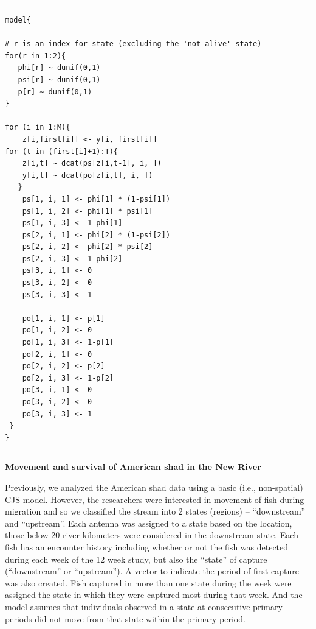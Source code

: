 \begin{panel}[htp]
\centering
\rule[0.1in]{\textwidth}{.03in}
{\small
\begin{verbatim}
model{

# r is an index for state (excluding the 'not alive' state)
for(r in 1:2){
   phi[r] ~ dunif(0,1)
   psi[r] ~ dunif(0,1)
   p[r] ~ dunif(0,1)
}    

for (i in 1:M){
    z[i,first[i]] <- y[i, first[i]]
for (t in (first[i]+1):T){
    z[i,t] ~ dcat(ps[z[i,t-1], i, ])
    y[i,t] ~ dcat(po[z[i,t], i, ])
   }
	ps[1, i, 1] <- phi[1] * (1-psi[1])
	ps[1, i, 2] <- phi[1] * psi[1]
	ps[1, i, 3] <- 1-phi[1]
	ps[2, i, 1] <- phi[2] * (1-psi[2])
	ps[2, i, 2] <- phi[2] * psi[2]
	ps[2, i, 3] <- 1-phi[2]
	ps[3, i, 1] <- 0
	ps[3, i, 2] <- 0
	ps[3, i, 3] <- 1

	po[1, i, 1] <- p[1]
	po[1, i, 2] <- 0
	po[1, i, 3] <- 1-p[1]
	po[2, i, 1] <- 0
	po[2, i, 2] <- p[2]
	po[2, i, 3] <- 1-p[2]
	po[3, i, 1] <- 0
	po[3, i, 2] <- 0
	po[3, i, 3] <- 1
 }
}
\end{verbatim}
}
\rule[-0.1in]{\textwidth}{.03in}
\caption{
\jags~ model specification for a two-state version of the multi-state
CJS model. Code modified 
from \cite[][Chapt. 9]{kery_schaub:2011}. }
\label{open.panel.msCJS}
\end{panel}

{\flushleft \bf Movement and survival of American shad in the New River}

Previously, we analyzed the American shad data using a basic (i.e., non-spatial) CJS
model.  However, the researchers were interested in movement of fish
during migration and so we classified the stream into 2 states
(regions) -- ``downstream'' and ``upstream''.  Each antenna was assigned
to a state based on the location, those below 20 river kilometers were
considered in the downstream state.  Each fish has an encounter
history including whether or not the fish was detected during each
week of the 12 week study, but also the ``state'' of capture
(``downstream'' or ``upstream'').  A vector to indicate the
period of first capture was also created.  Fish captured in more than
one state during the week were assigned the state in which they were
captured most during that week.  And the model assumes that individuals 
observed in a state at consecutive primary periods did not move from that state
within the primary period.

